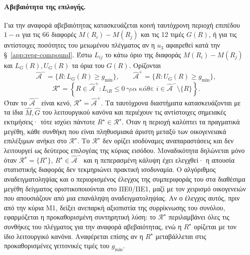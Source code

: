 \documentclass[11pt,a4paper]{article}
\begin{document}
\paragraph{Αβεβαιότητα της επιλογής.}
Για την αναφορά αβεβαιότητας κατασκευάζεται κοινή ταυτόχρονη περιοχή επιπέδου \(1-\alpha\) για τις 66 διαφορές \(M(R_i)-M(R_j)\) και τις 12 τιμές \(G(R)\), ή για τις αντίστοιχες ποσότητες του μειωμένου πλέγματος αν η \(u_3\) αφαιρεθεί κατά την §~\ref{app:repr-compound}. Έστω \(L_{ij}\) το κάτω όριο της διαφοράς \(M(R_i)-M(R_j)\) και \(L_G(R),U_G(R)\) τα όρια του \(G(R)\). Ορίζονται
\[
\widehat{\mathcal A}^{-}=\{R:L_G(R)\geq g_{\min}\},
\qquad
\widehat{\mathcal A}^{+}=\{R:U_G(R)\geq g_{\min}\},
\]
\[
\mathcal R^\star=
\left\{R\in\widehat{\mathcal A}^{+}:
L_{iR}\leq0\ \text{για κάθε }i\in\widehat{\mathcal A}^{-}\setminus\{R\}\right\}.
\]
Όταν το \(\widehat{\mathcal A}^{-}\) είναι κενό, \(\mathcal R^\star=\widehat{\mathcal A}^{+}\). Τα ταυτόχρονα διαστήματα κατασκευάζονται με τα ίδια \(\widehat M,\widehat G\) του λειτουργικού κανόνα και περιέχουν τις αντίστοιχες σημειακές εκτιμήσεις· τότε ισχύει πάντοτε \(R^\star\in\mathcal R^\star\). Όταν η περιοχή καλύπτει τα πραγματικά μεγέθη, κάθε συνθήκη που είναι πληθυσμιακά άριστη μεταξύ των οικογενειακά επιλέξιμων ανήκει στο \(\mathcal R^\star\). Το \(\mathcal R^\star\) δεν ορίζει ισοδύναμες αναπαραστάσεις και δεν λειτουργεί ως δεύτερος επιλογέας της κύριας εισόδου. Μοναδικότητα δηλώνεται μόνο όταν \(\mathcal R^\star=\{R^\star\}\), \(R^\star\in\widehat{\mathcal A}^{-}\) και η πεπερασμένη κάλυψη έχει ελεγχθεί· η απουσία στατιστικής διαφοράς δεν τεκμηριώνει πρακτική ισοδυναμία. Ο αλγόριθμος αναδειγματοληψίας και ο περιορισμένος έλεγχος της συμπεριφοράς του στα διαθέσιμα μεγέθη δείγματος οριστικοποιούνται στο ΠΕ0/ΠΕ1, μαζί με τον χειρισμό οικογενειών που απουσιάζουν από μια επανάληψη αναδειγματοληψίας. Αν ο έλεγχος αυτός, πριν από την κύρια M1, δείξει ανεπαρκή αξιοπιστία της συρρίκνωσης του συνόλου, εφαρμόζεται η προκαθορισμένη συντηρητική λύση: το \(\mathcal R^\star\) περιλαμβάνει όλες τις συνθήκες του πλέγματος για την αναφορά αβεβαιότητας, ενώ η \(R^\star\) ορίζεται με τον ίδιο λειτουργικό κανόνα. Αναφέρεται επίσης αν η \(R^\star\) μεταβάλλεται στις προκαθορισμένες γειτονικές τιμές του \(g_{\min}\).
\end{document}
